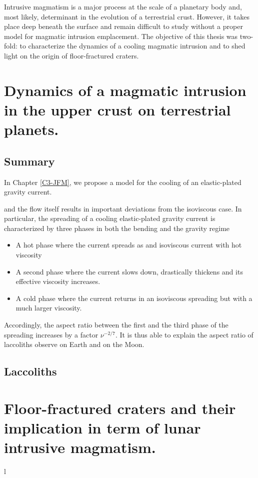 Intrusive magmatism  is a major  process at  the scale of  a planetary
body and, most  likely, determinant in the evolution  of a terrestrial
crust. However,  it takes  place deep beneath  the surface  and remain
difficult  to study  without  a proper  model  for magmatic  intrusion
emplacement.  The objective of this thesis was two-fold: to characterize the
dynamics of  a cooling  magmatic intrusion  and to  shed light  on the
origin of floor-fractured craters. 

\section*{Dynamics of a magmatic intrusion in the upper crust on
  terrestrial planets.}

\subsection*{Summary}
\label{sec:conclusion}

In Chapter  \ref{C3-JFM}, we  propose a  model for  the cooling  of an
elastic-plated gravity current. 


and  the  flow  itself  results   in  important  deviations  from  the
isoviscous  case.    In  particular,   the  spreading  of   a  cooling
elastic-plated  gravity current  is characterized  by three  phases in
both the bending and the gravity regime
\begin{itemize}
\item A hot phase where the  current spreads as and isoviscous current
  with hot viscosity
\item  A  second  phase  where the  current  slows  down,  drastically
  thickens and its effective viscosity increases.
\item  A  cold  phase  where  the current  returns  in  an  isoviscous
  spreading but with a much larger viscosity.
\end{itemize}



Accordingly, the aspect ratio between the first and the third phase of
the spreading increases  by a factor $\nu^{-2/7}$. It is  thus able to
explain the  aspect ratio of  laccoliths observe  on Earth and  on the
Moon.


\subsection*{Laccoliths }
\label{sec:laccoliths-}




\newpage
\section*{Floor-fractured  craters and  their implication  in term  of
  lunar intrusive magmatism.}
l
